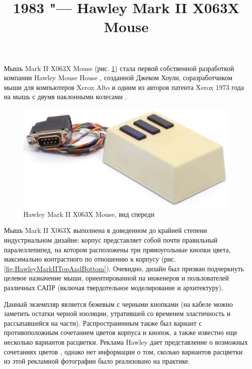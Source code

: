 \documentclass[11pt, a4paper]{article}
\begin{document}
\title{1983 "--- Hawley Mark II X063X Mouse}
\date{}
\maketitle

Мышь Mark II X063X Mouse (рис. \ref{fig:HawleyMarkIIPic}) стала первой собственной разработкой компании Hawley Mouse House \cite{hawley,mouses}, созданной Джеком Хоули, соразработчиком мыши для компьютеров Xerox Alto и одним из авторов патента Xerox 1973 года на мышь с двумя наклонными колесами \cite{pat}.

\begin{figure}[h]
   \centering
    \includegraphics[scale=0.6]{1983_hawley_mark_ii/pic_60.jpg}
    \caption{Hawley Mark II X063X Mouse, вид спереди}
    \label{fig:HawleyMarkIIPic}
\end{figure}

Мышь Mark II X063X выполнена в доведенном до крайней степени индустриальном дизайне: корпус представляет собой почти правильный паралеллепипед, на котором расположены три прямоугольные кнопки цвета, максимально контрастного по отношению к корпусу (рис. \ref{fig:HawleyMarkIITopAndBottom}). Очевидно, дизайн был призван подчеркнуть целевое назначение мыши, ориентированной на инженеров и пользователей различных САПР (включая твердотельное моделирование и архитектуру).

Данный экземпляр является бежевым с черными кнопками (на кабеле можно заметить остатки черной изоляции, утратившей со временем эластичность и рассыпавшейся на части). Распространенным также был вариант с противоположным сочетанием цветов корпуса и кнопок, а также известно еще несколько вариантов расцветки. Реклама Hawley дает представление о возможных сочетаниях цветов \cite{brochure}, однако нет информации о том, сколько вариантов расцветки из этой рекламной фотографии было реализовано на практике.
\end{document}
